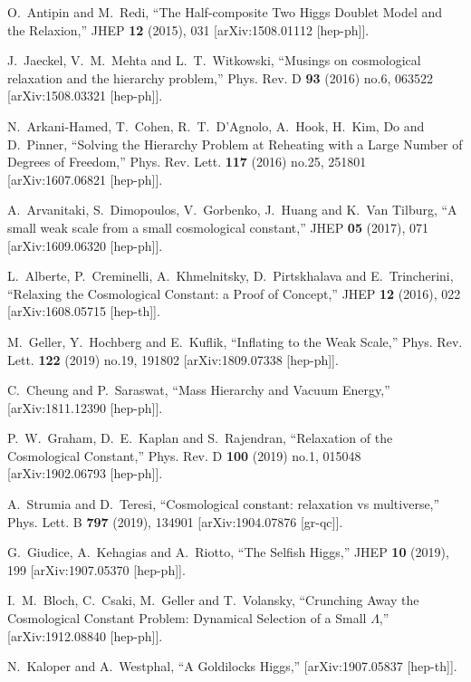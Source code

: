 \documentclass[12pt]{article}
\numberwithin{equation}{section}
\begin{document}
\begin{thebibliography}{999}
O.~Antipin and M.~Redi,
``The Half-composite Two Higgs Doublet Model and the Relaxion,'' JHEP \textbf{12} (2015), 031 [arXiv:1508.01112 [hep-ph]].

J.~Jaeckel, V.~M.~Mehta and L.~T.~Witkowski,
``Musings on cosmological relaxation and the hierarchy problem,'' Phys. Rev. D \textbf{93} (2016) no.6, 063522
[arXiv:1508.03321 [hep-ph]].

N.~Arkani-Hamed, T.~Cohen, R.~T.~D'Agnolo, A.~Hook, H.~Kim, Do and D.~Pinner,
``Solving the Hierarchy Problem at Reheating with a Large Number of Degrees of Freedom,''
Phys. Rev. Lett. \textbf{117} (2016) no.25, 251801 [arXiv:1607.06821 [hep-ph]].

A.~Arvanitaki, S.~Dimopoulos, V.~Gorbenko, J.~Huang and K.~Van Tilburg, ``A small weak scale from a small cosmological constant,'' JHEP \textbf{05} (2017), 071 [arXiv:1609.06320 [hep-ph]].

L.~Alberte, P.~Creminelli, A.~Khmelnitsky, D.~Pirtskhalava and E.~Trincherini,
``Relaxing the Cosmological Constant: a Proof of Concept,'' JHEP \textbf{12} (2016), 022
[arXiv:1608.05715 [hep-th]].

M.~Geller, Y.~Hochberg and E.~Kuflik,
``Inflating to the Weak Scale,''
Phys. Rev. Lett. \textbf{122} (2019) no.19, 191802
[arXiv:1809.07338 [hep-ph]].

C.~Cheung and P.~Saraswat,
``Mass Hierarchy and Vacuum Energy,''
[arXiv:1811.12390 [hep-ph]].

P.~W.~Graham, D.~E.~Kaplan and S.~Rajendran,
``Relaxation of the Cosmological Constant,''
Phys. Rev. D \textbf{100} (2019) no.1, 015048
[arXiv:1902.06793 [hep-ph]].

A.~Strumia and D.~Teresi,
``Cosmological constant: relaxation vs multiverse,''
Phys. Lett. B \textbf{797} (2019), 134901
[arXiv:1904.07876 [gr-qc]].

G.~Giudice, A.~Kehagias and A.~Riotto,
``The Selfish Higgs,''
JHEP \textbf{10} (2019), 199
[arXiv:1907.05370 [hep-ph]].

I.~M.~Bloch, C.~Csaki, M.~Geller and T.~Volansky,
``Crunching Away the Cosmological Constant Problem: Dynamical Selection of a Small $\Lambda$,''
[arXiv:1912.08840 [hep-ph]].

N.~Kaloper and A.~Westphal,
``A Goldilocks Higgs,''
[arXiv:1907.05837 [hep-th]].


\end{thebibliography}
\end{document}
